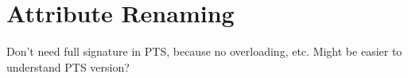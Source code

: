 %

\section{Attribute Renaming}\label{sec:attribute-renaming}

Don't need full signature in PTS, because no overloading, etc.
Might be easier to understand PTS version?